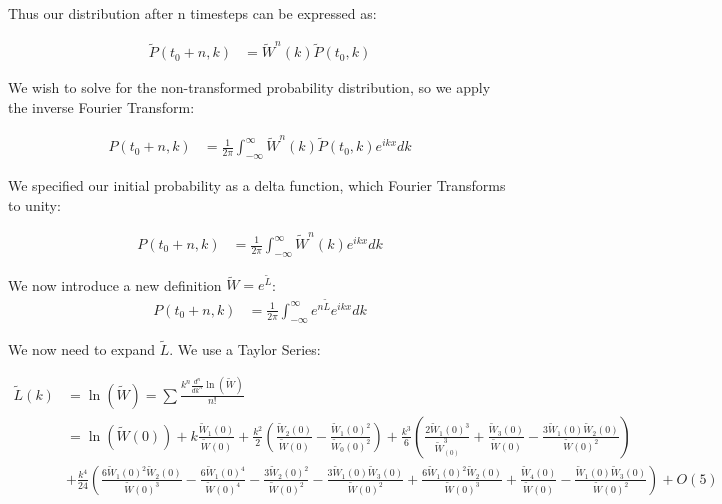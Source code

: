 \documentclass[10pt]{article} %
\begin{document}
Thus our distribution after n timesteps can be expressed as:

\begin{align}
  \widetilde{P}(t_0+n,k) &= \widetilde{W}^n(k)\widetilde{P}(t_0,k)
\end{align}

We wish to solve for the non-transformed probability distribution, so we
apply the inverse Fourier Transform:

\begin{align}
  P(t_0+n,k) &= \frac{1}{2\pi}\int_{-\infty}^{\infty}\widetilde{W}^n(k)\widetilde{P}(t_0,k)e^{ikx}dk
\end{align}

We specified our initial probability as a delta function, which Fourier Transforms to unity:

\begin{align}
  P(t_0+n,k) &= \frac{1}{2\pi}\int_{-\infty}^{\infty}\widetilde{W}^n(k)e^{ikx}dk
\end{align}

We now introduce a new definition $\widetilde{W} = e^{\widetilde{L}}$:\\

\begin{align}
  P(t_0+n,k) &= \frac{1}{2\pi}\int_{-\infty}^{\infty}e^{n\widetilde{L}}e^{ikx}dk
\end{align}

We now need to expand $\widetilde{L}$. We use a Taylor Series:

\begin{align*}
  \widetilde{L}(k) &= \ln(\widetilde{W}) = \sum\frac{k^n\frac{d^n}{dk^n}\ln(\widetilde{W})}{n!}\\
  &= \ln\left(\widetilde{W}(0)\right) + k\frac{\widetilde{W}_1(0)}{\widetilde{W}(0)}
  + \frac{k^2}{2}\left(\frac{\widetilde{W}_2(0)}{\widetilde{W}(0)} - \frac{\widetilde{W}_1(0)^2}{\widetilde{W}_0(0)^2}\right)
  + \frac{k^3}{6}\left(\frac{2\widetilde{W}_1(0)^3}{\widetilde{W}_(0)^3} + \frac{\widetilde{W}_3(0)}{\widetilde{W}(0)}
     - \frac{3\widetilde{W}_1(0)\widetilde{W}_2(0)}{\widetilde{W}(0)^2}\right)\\
  &+ \frac{k^4}{24}\left(\frac{6\widetilde{W}_1(0)^2\widetilde{W}_2(0)}{\widetilde{W}(0)^3} - \frac{6\widetilde{W}_1(0)^4}{\widetilde{W}(0)^4}
  - \frac{3\widetilde{W}_2(0)^2}{\widetilde{W}(0)^2} - \frac{3\widetilde{W}_1(0)\widetilde{W}_3(0)}{\widetilde{W}(0)^2}
  + \frac{6\widetilde{W}_1(0)^2\widetilde{W}_2(0)}{\widetilde{W}(0)^3} + \frac{\widetilde{W}_4(0)}{\widetilde{W}(0)}
  - \frac{\widetilde{W}_1(0)\widetilde{W}_3(0)}{\widetilde{W}(0)^2}\right) + O(5)
\end{align*}
\end{document}
